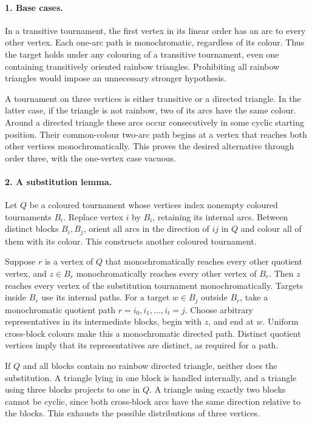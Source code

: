 \documentclass[11pt,a4paper]{article}
\begin{document}
\paragraph{1. Base cases.}
In a transitive tournament, the first vertex in its linear order
has an arc to every other vertex. Each one-arc path is monochromatic,
regardless of its colour. Thus the target holds under any colouring
of a transitive tournament, even one containing transitively oriented
rainbow triangles. Prohibiting all rainbow triangles would impose
an unnecessary stronger hypothesis.

A tournament on three vertices is either transitive or a directed
triangle. In the latter case, if the triangle is not rainbow, two
of its arcs have the same colour. Around a directed triangle these
arcs occur consecutively in some cyclic starting position. Their
common-colour two-arc path begins at a vertex that reaches both
other vertices monochromatically. This proves the desired alternative
through order three, with the one-vertex case vacuous.

\paragraph{2. A substitution lemma.}
Let $Q$ be a coloured tournament whose vertices index nonempty
coloured tournaments $B_i$. Replace vertex $i$ by $B_i$, retaining
its internal arcs. Between distinct blocks $B_i,B_j$, orient all
arcs in the direction of $ij$ in $Q$ and colour all of them with
its colour. This constructs another coloured tournament.

Suppose $r$ is a vertex of $Q$ that monochromatically reaches every
other quotient vertex, and $z\in B_r$ monochromatically reaches
every other vertex of $B_r$. Then $z$ reaches every vertex of the
substitution tournament monochromatically. Targets inside $B_r$
use its internal paths. For a target $w\in B_j$ outside $B_r$,
take a monochromatic quotient path $r=i_0,i_1,\ldots,i_t=j$.
Choose arbitrary representatives in its intermediate blocks, begin
with $z$, and end at $w$. Uniform cross-block colours make this a
monochromatic directed path. Distinct quotient vertices imply
that its representatives are distinct, as required for a path.

If $Q$ and all blocks contain no rainbow directed triangle, neither
does the substitution. A triangle lying in one block is handled
internally, and a triangle using three blocks projects to one in
$Q$. A triangle using exactly two blocks cannot be cyclic, since
both cross-block arcs have the same direction relative to the blocks.
This exhausts the possible distributions of three vertices.
\end{document}
